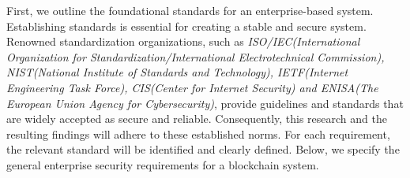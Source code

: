 First, we outline the foundational standards for an enterprise-based system. Establishing standards is essential for creating a stable and secure system. Renowned standardization organizations, such as \textit{ISO/IEC(International Organization for Standardization/International Electrotechnical Commission)\cite{iso_std}\cite{iec_std}, NIST(National Institute of Standards and Technology)\cite{nist_std}, IETF(Internet Engineering Task Force)\cite{ietf_std}, CIS(Center for Internet Security)\cite{cis_std} and ENISA(The European Union Agency for Cybersecurity)\cite{enisa_std}}, provide guidelines and standards that are widely accepted as secure and reliable. Consequently, this research and the resulting findings will adhere to these established norms. For each requirement, the relevant standard will be identified and clearly defined. Below, we specify the general enterprise security requirements for a blockchain system.

